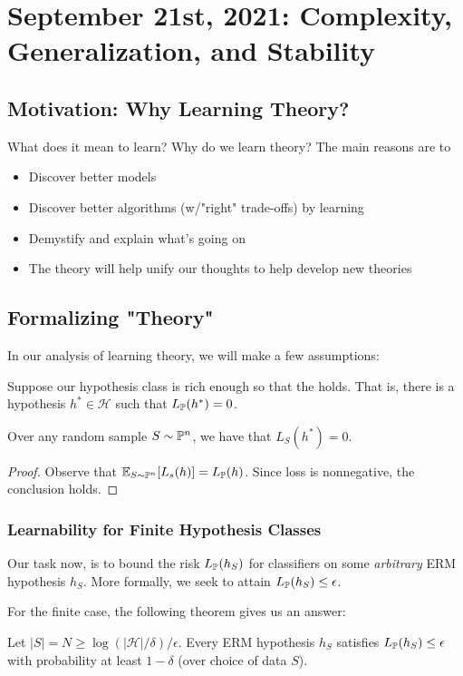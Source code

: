 \documentclass[11pt]{scrartcl}
\begin{document}
\section{September 21st, 2021: Complexity, Generalization, and Stability}

\subsection{Motivation: Why Learning Theory?}
What does it mean to learn? Why do we learn theory? The main reasons are to 
\begin{itemize}
    \item Discover better models
    \item Discover better algorithms (w/"right" trade-offs) by learning
    \item Demystify and explain what's going on
    \item The theory will help unify our thoughts to help develop new theories
\end{itemize}
\subsection{Formalizing "Theory"}
In our analysis of learning theory, we will make a few assumptions:

\begin{assump}
Suppose our hypothesis class is rich enough so that the  holds. That is, there is a hypothesis $h^* \in \mathcal{H}$ such that $L_{\mathbb{P}}(h^*)=0$. 
\end{assump}

\begin{lemma}
Over any random sample $S \sim \mathbb{P}^n$, we have that $L_S(h^*)=0$.
\end{lemma}
\begin{proof}
Observe that $\mathbb{E}_{S \sim \mathbb{P}^n}[L_s(h)]=L_{\mathbb{P}}(h)$. Since loss is nonnegative, the conclusion holds.
\end{proof}

\subsubsection{Learnability for Finite Hypothesis Classes}
Our task now, is to bound the risk $L_{\mathbb{P}}(h_S)$ for classifiers on some \textit{arbitrary} ERM hypothesis $h_S$. More formally, we seek to attain $L_{\mathbb{P}}(h_S) \le \epsilon$.

For the finite case, the following theorem gives us an answer:
\begin{thm}
Let $|S|=N \ge \log(|\mathcal{H}|/\delta)/\epsilon$. Every ERM hypothesis $h_S$ satisfies $L_{\mathbb{P}}(h_S) \le \epsilon$ with probability at least $1-\delta$ (over choice of data $S$). 
\end{thm}
\end{document}
